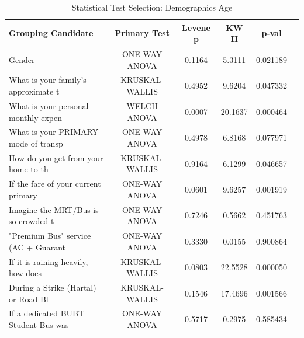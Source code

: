 \begin{table}[htbp]
\centering
\caption{Statistical Test Selection: Demographics Age}
\label{tab:analysis_06_demographics}
\begin{tabular}{lccccc}
\hline
\textbf{Grouping Candidate} & \textbf{Primary Test} & \textbf{Levene p} & \textbf{KW H} & \textbf{p-val} \\
\hline
Gender & ONE-WAY ANOVA & 0.1164 & 5.3111 & 0.021189 \\
What is your family's approximate t & KRUSKAL-WALLIS & 0.4952 & 9.6204 & 0.047332 \\
What is your personal monthly expen & WELCH ANOVA & 0.0007 & 20.1637 & 0.000464 \\
What is your PRIMARY mode of transp & ONE-WAY ANOVA & 0.4978 & 6.8168 & 0.077971 \\
How do you get from your home to th & KRUSKAL-WALLIS & 0.9164 & 6.1299 & 0.046657 \\
If the fare of your current primary & ONE-WAY ANOVA & 0.0601 & 9.6257 & 0.001919 \\
Imagine the MRT/Bus is so crowded t & ONE-WAY ANOVA & 0.7246 & 0.5662 & 0.451763 \\
"Premium Bus" service (AC + Guarant & ONE-WAY ANOVA & 0.3330 & 0.0155 & 0.900864 \\
If it is raining heavily, how does  & KRUSKAL-WALLIS & 0.0803 & 22.5528 & 0.000050 \\
During a Strike (Hartal) or Road Bl & KRUSKAL-WALLIS & 0.1546 & 17.4696 & 0.001566 \\
If a dedicated BUBT Student Bus was & ONE-WAY ANOVA & 0.5717 & 0.2975 & 0.585434 \\
\hline
\end{tabular}
\end{table}
